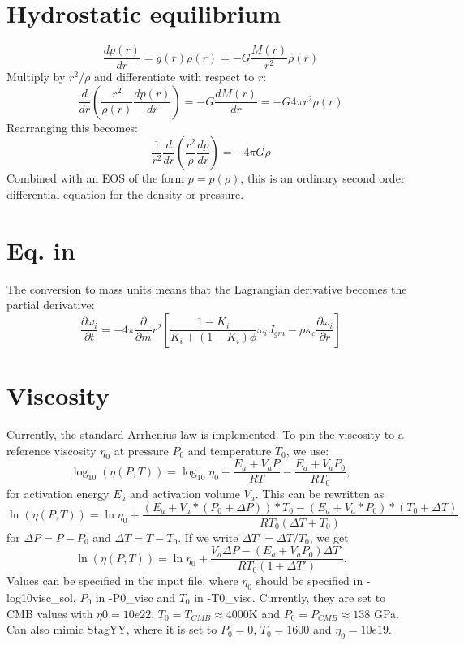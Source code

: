\documentclass[12pt,notitlepage]{article}
\begin{document}
\section{Hydrostatic equilibrium}
\label{sect:hydrostatic}
\begin{equation}
\frac{dp(r)}{dr} = g(r) \rho(r) = -G \frac{M(r)}{r^2}\rho(r)
\end{equation}
Multiply by $r^2/\rho$ and differentiate with respect to $r$:
\begin{equation}
\frac{d}{dr} \left( \frac{r^2}{\rho(r)} \frac{dp(r)}{dr} \right) = -G \frac{dM(r)}{dr} = -G 4 \pi r^2 \rho(r)
\end{equation}
Rearranging this becomes:
\begin{equation}
\frac{1}{r^2} \frac{d}{dr} \left( \frac{r^2}{\rho}\frac{dp}{dr} \right) = -4 \pi G \rho
\end{equation}
Combined with an EOS of the form $p=p(\rho)$, this is an ordinary second order differential equation for the density or pressure.
\section{Eq. in \cite{ABE93}}
The conversion to mass units means that the Lagrangian derivative becomes the partial derivative:
\begin{equation}
\frac{\partial \omega_i}{\partial t} = -4 \pi \frac{\partial}{\partial m} r^2 \left[ \frac{1-K_i}{K_i+(1-K_i)\phi} \omega_i J_{gm} - \rho \kappa_c \frac{\partial \omega_i}{\partial r} \right]
\end{equation}

\section{Viscosity}
Currently, the standard Arrhenius law is implemented.  To pin the viscosity to a reference viscosity $\eta_0$ at pressure $P_0$ and temperature $T_0$, we use:
\begin{equation}
\log_{10} ( \eta (P,T)) = \log_{10} \eta_0 + \frac{E_a + V_aP}{RT} - \frac{E_a + V_a P_0}{R T_0},
\end{equation}
for activation energy $E_a$ and activation volume $V_a$. This can be rewritten as
\begin{equation*}
\ln ( \eta (P,T)) = \ln \eta_0 + \frac{(E_a + V_a*(P_0 + \Delta P))*T_0 - (E_a + V_a*P_0)*(T_0 + \Delta T)}{R T_0 (\Delta T + T_0)}
\end{equation*}
for $\Delta P = P - P_0$ and $\Delta T = T - T_0$. If we write $\Delta T' = \Delta T/T_0$, we get
\begin{equation}
\ln ( \eta (P,T)) = \ln \eta_0 + \frac{V_a \Delta P - (E_a + V_a P_0)\Delta T'}{R T_0 (1 + \Delta T')}.
\end{equation}
Values can be specified in the input file, where $\eta_0$ should be specified in -log10visc\_sol, $P_0$ in -P0\_visc and $T_0$ in -T0\_visc. Currently, they are set to CMB values with $\eta0 = 10e22$, $T_0 = T_{CMB} \approx 4000$K and $P_0 = P_{CMB} \approx 138$ GPa. Can also mimic StagYY, where it is set to $P_0 = 0$, $T_0 = 1600$ and $\eta_0 = 10e19$.
\end{document}
